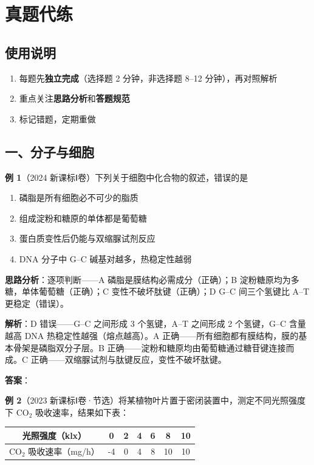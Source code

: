 \section{真题代练}

\subsection{使用说明}
\begin{enumerate}
  \item 每题先\textbf{独立完成}（选择题 2 分钟，非选择题 8--12 分钟），再对照解析
  \item 重点关注\textbf{思路分析}和\textbf{答题规范}
  \item 标记错题，定期重做
\end{enumerate}

\subsection{一、分子与细胞}

\textbf{例 1}（2024 新课标Ⅰ卷）下列关于细胞中化合物的叙述，错误的是
\begin{enumerate}
  \item[A.] 磷脂是所有细胞必不可少的脂质
  \item[B.] 组成淀粉和糖原的单体都是葡萄糖
  \item[C.] 蛋白质变性后仍能与双缩脲试剂反应
  \item[D.] DNA 分子中 G--C 碱基对越多，热稳定性越弱
\end{enumerate}

\textbf{思路分析}：逐项判断——A 磷脂是膜结构必需成分（正确）；B 淀粉糖原均为多糖，单体葡萄糖（正确）；C 变性不破坏肽键（正确）；D G--C 间三个氢键比 A--T 更稳定（错误）。

\textbf{解析}：D 错误——G--C 之间形成 3 个氢键，A--T 之间形成 2 个氢键，G--C 含量越高 DNA 热稳定性越强（熔点越高）。A 正确——所有细胞都有膜结构，膜的基本骨架是磷脂双分子层。B 正确——淀粉和糖原均由葡萄糖通过糖苷键连接而成。C 正确——双缩脲试剂与肽键反应，变性不破坏肽键。

\textbf{答案}：

\textbf{例 2}（2023 新课标Ⅰ卷·节选）将某植物叶片置于密闭装置中，测定不同光照强度下 CO$_2$ 吸收速率，结果如下表：

\begin{center}
\begin{tabular}{c|c|c|c|c|c|c}
光照强度（klx） & 0 & 2 & 4 & 6 & 8 & 10 \\ \hline
CO$_2$ 吸收速率（mg/h） & -4 & 0 & 4 & 8 & 10 & 10
\end{tabular}
\end{center}

